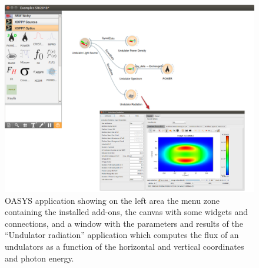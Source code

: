 \documentclass{aip-cp}
\begin{document}
\begin{figure}[h]
\includegraphics[width=14cm]{FIGURES/canvas.png}
\caption{OASYS application showing on the left area the menu zone containing the installed add-ons, the canvas with some widgets and connections, and a window with the parameters and results of the ``Undulator radiation'' application which computes the flux of an undulators as a function of the horizontal and vertical coordinates and photon energy.}
\label{figCanvas}
\end{figure}
\end{document}
